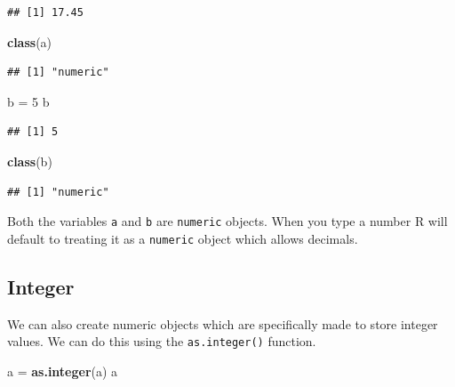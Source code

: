 \documentclass[
]{book}
\newenvironment{Shaded}{\begin{snugshade}}{\end{snugshade}}
\newcommand{\DecValTok}[1]{\textcolor[rgb]{0.00,0.00,0.81}{#1}}
\newcommand{\KeywordTok}[1]{\textcolor[rgb]{0.13,0.29,0.53}{\textbf{#1}}}
\newcommand{\NormalTok}[1]{#1}
\newcommand{\StringTok}[1]{\textcolor[rgb]{0.31,0.60,0.02}{#1}}
\begin{document}
\begin{verbatim}
## [1] 17.45
\end{verbatim}

\begin{Shaded}
\begin{Highlighting}[]
\KeywordTok{class}\NormalTok{(a)}
\end{Highlighting}
\end{Shaded}

\begin{verbatim}
## [1] "numeric"
\end{verbatim}

\begin{Shaded}
\begin{Highlighting}[]
\NormalTok{b =}\StringTok{ }\DecValTok{5}
\NormalTok{b }
\end{Highlighting}
\end{Shaded}

\begin{verbatim}
## [1] 5
\end{verbatim}

\begin{Shaded}
\begin{Highlighting}[]
\KeywordTok{class}\NormalTok{(b)}
\end{Highlighting}
\end{Shaded}

\begin{verbatim}
## [1] "numeric"
\end{verbatim}

Both the variables \texttt{a} and \texttt{b} are \texttt{numeric} objects. When you type a number R will default to treating it as a \texttt{numeric} object which allows decimals.

\hypertarget{integer}{%
\subsection*{Integer}\label{integer}}

We can also create numeric objects which are specifically made to store integer values. We can do this using the \texttt{as.integer()} function.

\begin{Shaded}
\begin{Highlighting}[]
\NormalTok{a =}\StringTok{ }\KeywordTok{as.integer}\NormalTok{(a)}
\NormalTok{a}
\end{Highlighting}
\end{Shaded}
\end{document}
